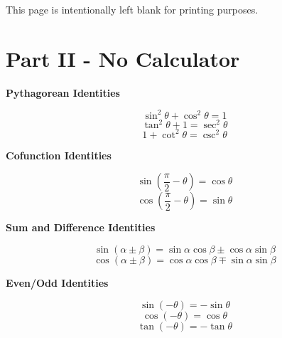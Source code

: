 \documentclass[addpoints]{exam}
\begin{document}
\newpage
This page is intentionally left blank for printing purposes.

\phantom{hello world}

\newpage

\section*{Part II - No Calculator}

\begin{tcolorbox}[title=Recall: \textit{Fundamental Trigonometric Identities},title filled,colframe=black,sharpish corners,width=\linewidth]
    \begin{minipage}[t]{.45\linewidth}

        \begin{center}
            \textbf{Pythagorean Identities}
        \end{center}
        \[\sin^2\theta+\cos^2\theta=1\]
        \[\tan^2\theta+1=\sec^2\theta\]
        \[1+\cot^2\theta=\csc^2\theta\]
    \end{minipage}
    \hfil
    \begin{minipage}[t]{.45\linewidth}
        \begin{center}
            \textbf{Cofunction Identities}
        \end{center}
        \[\sin\left(\frac{\pi}{2}-\theta\right)=\cos\theta\]
        \[\cos\left(\frac{\pi}{2}-\theta\right)=\sin\theta\]
    \end{minipage}

    \vspace{.2in}

    \begin{minipage}[t]{.45\linewidth}
        \begin{center}
            \textbf{Sum and Difference Identities}
        \end{center}
        \[\sin(\alpha\pm\beta)=\sin\alpha\cos\beta\pm\cos\alpha\sin\beta\]
        \[\cos(\alpha\pm\beta)=\cos\alpha\cos\beta\mp\sin\alpha\sin\beta\]
    \end{minipage}
    \hfil
    \begin{minipage}[t]{.45\linewidth}
        \begin{center}
            \textbf{Even/Odd Identities}
        \end{center}
        \[\sin(-\theta)=-\sin\theta\]
        \[\cos(-\theta)=\cos\theta\]
        \[\tan(-\theta)=-\tan\theta\]
    \end{minipage}


\end{tcolorbox}
\end{document}
